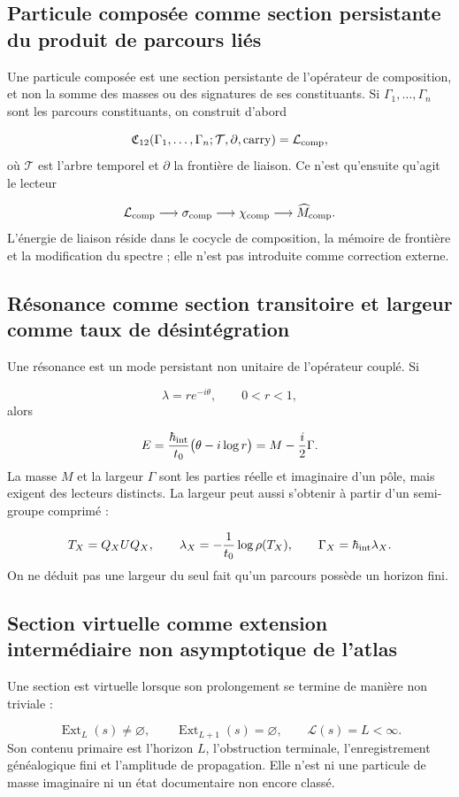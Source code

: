 \subsection{Particule composée comme section persistante du produit de parcours liés}
Une particule composée est une section persistante de l'opérateur de composition, et non la somme des masses ou des signatures de ses constituants. Si \(\Gamma_1,\ldots,\Gamma_n\) sont les parcours constituants, on construit d'abord

\[
 \mathfrak C_{12}
 (\Gamma_1,\ldots,\Gamma_n;\mathcal T,\partial,\mathrm{carry})
 =\mathcal L_{\rm comp},
\]
où \(\mathcal T\) est l'arbre temporel et \(\partial\) la frontière de liaison. Ce n'est qu'ensuite qu'agit le lecteur

\[
 \mathcal L_{\rm comp}\longrightarrow\sigma_{\rm comp}
 \longrightarrow\chi_{\rm comp}
 \longrightarrow\widehat M_{\rm comp}.
\]
L'énergie de liaison réside dans le cocycle de composition, la mémoire de frontière et la modification du spectre ; elle n'est pas introduite comme correction externe.

\subsection{Résonance comme section transitoire et largeur comme taux de désintégration}
Une résonance est un mode persistant non unitaire de l'opérateur couplé. Si

\[
 \lambda=re^{-i\theta},\qquad 0<r<1,
\]
alors

\[
 E=\frac{\hbar_{\rm int}}{t_0}
 \bigl(\theta-i\log r\bigr)
 =M-\frac{i}{2}\Gamma.
\]
La masse \(M\) et la largeur \(\Gamma\) sont les parties réelle et imaginaire d'un pôle, mais exigent des lecteurs distincts. La largeur peut aussi s'obtenir à partir d'un semi-groupe comprimé :

\[
 T_X=Q_XUQ_X,\qquad
 \lambda_X=-\frac1{t_0}\log\rho(T_X),\qquad
 \Gamma_X=\hbar_{\rm int}\lambda_X.
\]
On ne déduit pas une largeur du seul fait qu'un parcours possède un horizon fini.

\subsection{Section virtuelle comme extension intermédiaire non asymptotique de l'atlas}
Une section est virtuelle lorsque son prolongement se termine de manière non triviale :

\[
 \operatorname{Ext}_{L}(s)\ne\varnothing,\qquad
 \operatorname{Ext}_{L+1}(s)=\varnothing,\qquad
 \mathcal L(s)=L<\infty.
\]
Son contenu primaire est l'horizon \(L\), l'obstruction terminale, l'enregistrement généalogique fini et l'amplitude de propagation. Elle n'est ni une particule de masse imaginaire ni un état documentaire non encore classé.

